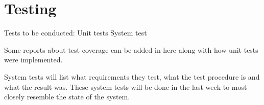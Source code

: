 \chapter{Testing}
Tests to be conducted:
Unit tests
System test

Some reports about test coverage can be added in here along with how unit tests were implemented.

System tests will list what requirements they test, what the test procedure is and what the result was.
These system tests will be done in the last week to most closely resemble the state of the system.
